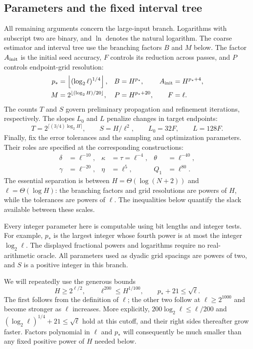 \subsection{Parameters and the fixed interval tree}
All remaining arguments concern the large-input branch. Logarithms with
subscript two are binary, and $\ln$ denotes the natural logarithm.
The coarse estimator and interval tree use the branching factors $B$ and
$M$ below. The factor $A_{\rm init}$ is the initial seed accuracy, $F$
controls its reduction across passes, and $P$ controls endpoint-grid
resolution:
\begin{align*}
 p_*&=\left\lfloor(\log_2\ell)^{1/4}\right\rfloor,
 &B&=H^{p_*},&A_{\rm init}&=H^{p_*+4},\\
 M&=2^{\lfloor(\log_2 H)/20\rfloor},
 &P&=H^{p_*+20},&F&=\ell.
\end{align*}
The counts $T$ and $S$ govern preliminary propagation and refinement
iterations, respectively. The slopes $L_0$ and $L$ penalize changes in
target endpoints:
\[
 T=2^{\lceil(3/4)\log_2H\rceil},\qquad S=H/\ell^2,
 \qquad L_0=32F,\qquad L=128F.
\]
Finally, fix the error tolerances and the sampling and optimization
parameters. Their roles are specified at the corresponding constructions:
\begin{align*}
 \delta&=\ell^{-10},&\kappa&=\tau=\ell^{-4},
 &\theta&=\ell^{-40},\\
 \gamma&=\ell^{-20},&\eta&=\ell^5,&Q_1&=\ell^{80}.
\end{align*}
The essential separation is between $H=\Theta(\log(N+2))$ and
$\ell=\Theta(\log H)$: the branching factors and grid resolutions are
powers of $H$, while the tolerances are powers of $\ell$. The inequalities
below quantify the slack available between these scales.

Every integer parameter here is computable using bit lengths and integer
tests. For example, $p_*$ is the largest integer whose fourth power is
at most the integer $\log_2\ell$. The displayed fractional powers and
logarithms require no real-arithmetic oracle. All parameters used as dyadic
grid spacings are powers of two, and $S$ is a positive integer in this
branch.

We will repeatedly use the generous bounds
\begin{equation}\label{eq:parameter-slack}
 H\ge2^{\ell/2},\qquad \ell^{200}\le H^{1/100},\qquad
 p_*+21\le\sqrt\ell.
\end{equation}
The first follows from the definition of $\ell$; the other two follow at
$\ell\ge2^{1000}$ and become stronger as $\ell$ increases. More explicitly,
$200\log_2\ell\le\ell/200$ and
$(\log_2\ell)^{1/4}+21\le\sqrt\ell$ hold at this cutoff, and their
right sides thereafter grow faster. Factors polynomial in $\ell$ and
$p_*$ will consequently be much smaller than any fixed positive power
of $H$ needed below.

